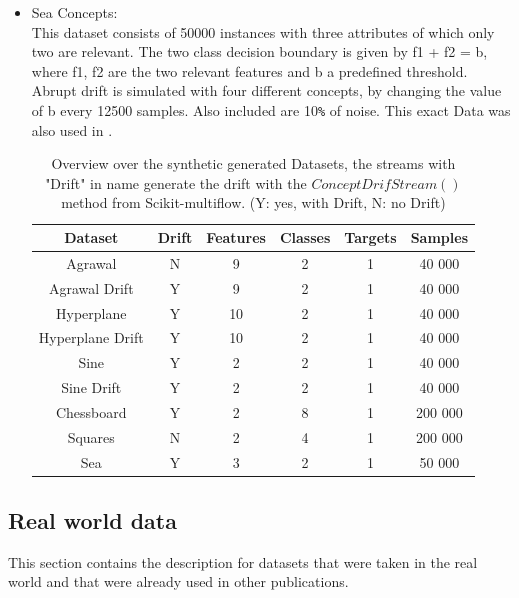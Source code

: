 \documentclass[12pt,oneside,a4paper,parskip]{scrbook}
\begin{document}
\begin{itemize}
  \item Sea Concepts: \\
        This dataset consists of 50000 instances with three attributes of which only two are relevant. 
        The two class decision boundary is given by f1 + f2 = b, where f1, f2 are the two relevant features and b a
        predefined threshold. Abrupt drift is simulated with four different concepts, by changing the value of b every 
        12500 samples. Also included are 10\verb|%| of noise. 
        This exact Data was also used in \cite{SEADataset}.

        \begin{table}[H]
          \label{tab:synthdata}
          \centering
          \begin{tabular} {|| c c c c c c ||} 
            \hline
              Dataset & Drift &Features & Classes & Targets & Samples \\
            \hline\hline
              Agrawal & N & 9 & 2 & 1 & 40 000 \\
            \hline
              Agrawal Drift & Y & 9 & 2 & 1 & 40 000 \\
            \hline 
              Hyperplane & Y & 10 & 2 & 1 & 40 000 \\
            \hline 
              Hyperplane Drift & Y & 10 & 2 & 1 & 40 000 \\
            \hline
              Sine & Y & 2 & 2 & 1 & 40 000 \\
            \hline
              Sine Drift & Y & 2 & 2 & 1 & 40 000 \\
            \hline
              Chessboard & Y & 2 & 8 & 1 & 200 000 \\
            \hline
              Squares & N & 2 & 4 & 1 & 200 000 \\
            \hline
              Sea & Y & 3 & 2 & 1 & 50 000 \\
            \hline
          \end{tabular} 
          \caption{Overview over the synthetic generated Datasets, the streams with "Drift" in name generate the drift
          with the $ConceptDrifStream()$ method from Scikit-multiflow. (Y: yes, with Drift, N: no Drift) }
        \end{table}
  
\end{itemize}

\subsection{Real world data}
This section contains the description for datasets that were taken in the real world and that were already used in other
publications. 
\end{document}

